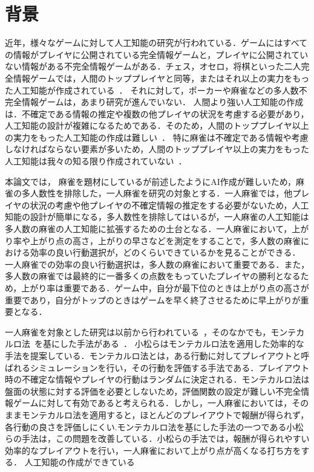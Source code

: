\section{背景}
\label{background}
近年，様々なゲームに対して人工知能の研究が行われている．ゲームにはすべての情報がプレイヤに公開されている完全情報ゲームと，プレイヤに公開されていない情報がある不完全情報ゲームがある．チェス，オセロ，将棋といった二人完全情報ゲームでは，人間のトッププレイヤと同等，またはそれ以上の実力をもった人工知能が作成されている~\cite{othello,deep,syogi}．
それに対して，ポーカーや麻雀などの多人数不完全情報ゲームは，あまり研究が進んでいない． 人間より強い人工知能の作成は．\fi 不確定である情報の推定や複数の他プレイヤの状況を考慮する必要があり，人工知能の設計が複雑になるためである．そのため，人間のトッププレイヤ以上の実力をもった人工知能の作成は難しい~\cite{poker1,poker2}．
特に麻雀は不確定である情報や考慮しなければならない要素が多いため，人間のトッププレイヤ以上の実力をもった人工知能は我々の知る限り作成されていない~\cite{majang3,majang2,majang4,majang1}．

本論文では， 麻雀を題材にしているが前述したようにAI作成が難しいため，\fi 麻雀の多人数性を排除した，一人麻雀を研究の対象とする．一人麻雀では，他プレイヤの状況の考慮や他プレイヤの不確定情報の推定をする必要がないため，人工知能の設計が簡単になる，多人数性を排除してはいるが，一人麻雀の人工知能は多人数の麻雀の人工知能に拡張するための土台となる．一人麻雀において，上がり率や上がり点の高さ，上がりの早さなどを測定をすることで，多人数の麻雀における効率の良い行動選択が，どのくらいできているかを見ることができる． 一人麻雀での効率の良い行動選択は，多人数の麻雀において重要である．\fi また，多人数の麻雀では最終的に一番多くの点数をもっていたプレイヤの勝利となるため，上がり率は重要である．ゲーム中，自分が最下位のときは上がり点の高さが重要であり，自分がトップのときはゲームを早く終了させるために早上がりが重要となる．

一人麻雀を対象とした研究は以前から行われている~\cite{majang2,majang4}，そのなかでも，モンテカルロ法~\cite{montecarlo}を基にした手法がある~\cite{che,komatu}． 小松らはモンテカルロ法を適用した効率的な手法を提案している．\fi モンテカルロ法とは，ある行動に対してプレイアウトと呼ばれるシミュレーションを行い，その行動を評価する手法である．プレイアウト時の不確定な情報やプレイヤの行動はランダムに決定される．モンテカルロ法は盤面の状態に対する評価を必要としないため，評価関数の設定が難しい不完全情報ゲームに対して有効であると考えられる．しかし，一人麻雀においては，そのままモンテカルロ法を適用すると，ほとんどのプレイアウトで報酬が得られず，各行動の良さを評価しにくい.モンテカルロ法を基にした手法の一つである小松らの手法は，この問題を改善している．小松らの手法では，報酬が得られやすい効率的なプレイアウトを行い，一人麻雀において上がり点が高くなる打ち方をする． 人工知能の作成ができている\fi 

